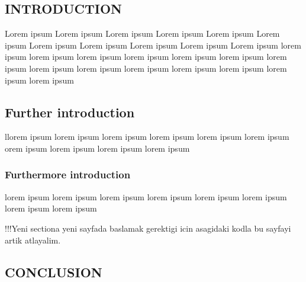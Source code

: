 \documentclass[12pt,english]{article}
\begin{document}
\begin{onehalfspace}

\setcounter{page}{1}
\end{onehalfspace}

\pagebreak

\begin{onehalfspace}

\section{INTRODUCTION}
\end{onehalfspace}

\noindent Lorem ipsum Lorem ipsum Lorem ipsum Lorem ipsum Lorem ipsum
Lorem ipsum Lorem ipsum Lorem ipsum Lorem ipsum Lorem ipsum Lorem
ipsum lorem ipsum lorem ipsum lorem ipsum lorem ipsum lorem ipsum
lorem ipsum lorem ipsum lorem ipsum lorem ipsum lorem ipsum lorem
ipsum lorem ipsum lorem ipsum lorem ipsum 

\begin{onehalfspace}

\subsection{Further introduction}
\end{onehalfspace}

\begin{onehalfspace}
llorem ipsum lorem ipsum lorem ipsum lorem ipsum lorem ipsum lorem
ipsum orem ipsum lorem ipsum lorem ipsum lorem ipsum 
\end{onehalfspace}

\begin{onehalfspace}

\subsubsection{Furthermore introduction}
\end{onehalfspace}

lorem ipsum lorem ipsum lorem ipsum lorem ipsum lorem ipsum lorem
ipsum lorem ipsum lorem ipsum 

!!!Yeni sectiona yeni sayfada baslamak gerektigi icin asagidaki kodla
bu sayfayi artik atlayalim.

\begin{onehalfspace}
\pagebreak
\end{onehalfspace}

\begin{onehalfspace}

\section{\noindent CONCLUSION}
\end{onehalfspace}
\end{document}
